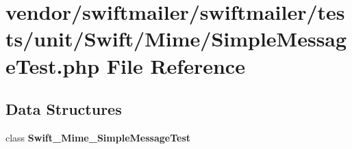\section{vendor/swiftmailer/swiftmailer/tests/unit/\+Swift/\+Mime/\+Simple\+Message\+Test.php File Reference}
\label{_simple_message_test_8php}
\subsection*{Data Structures}
\begin{DoxyCompactItemize}
\item 
class {\bf Swift\+\_\+\+Mime\+\_\+\+Simple\+Message\+Test}
\end{DoxyCompactItemize}
